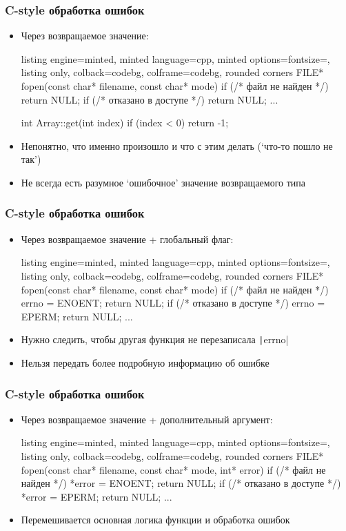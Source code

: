 \documentclass[10pt]{beamer}
\begin{document}
\begin{frame}[fragile]
\frametitle{C-style обработка ошибок}
\begin{itemize}
\item Через возвращаемое значение:
\begin{tcblisting}{listing engine=minted, minted language=cpp, minted options={fontsize=\scriptsize}, listing only, colback=codebg, colframe=codebg, rounded corners}
FILE* fopen(const char* filename, const char* mode) {
  if (/* файл не найден */) {
    return NULL;
  }
  if (/* отказано в доступе */) {
    return NULL;
  }
  ...
}

int Array::get(int index) {
  if (index < 0) return -1;
}
\end{tcblisting}
\pause
\item Непонятно, что именно произошло и что с этим делать (`что-то пошло не так')
\pause
\item Не всегда есть разумное `ошибочное' значение возвращаемого типа
\end{itemize}
\end{frame}

\begin{frame}[fragile]
\frametitle{C-style обработка ошибок}
\begin{itemize}
\item Через возвращаемое значение + глобальный флаг:
\begin{tcblisting}{listing engine=minted, minted language=cpp, minted options={fontsize=\scriptsize}, listing only, colback=codebg, colframe=codebg, rounded corners}
FILE* fopen(const char* filename, const char* mode) {
  if (/* файл не найден */) {
    errno = ENOENT;
    return NULL;
  }
  if (/* отказано в доступе */) {
    errno = EPERM;
    return NULL;
  }
  ...
}
\end{tcblisting}
\pause
{}
\item Нужно следить, чтобы другая функция не перезаписала \texttt|errno|
\pause
\item Нельзя передать более подробную информацию об ошибке
\end{itemize}
\end{frame}

\begin{frame}[fragile]
\frametitle{C-style обработка ошибок}
\begin{itemize}
\item Через возвращаемое значение + дополнительный аргумент:
\begin{tcblisting}{listing engine=minted, minted language=cpp, minted options={fontsize=\scriptsize}, listing only, colback=codebg, colframe=codebg, rounded corners}
FILE* fopen(const char* filename, const char* mode, int* error)
{
  if (/* файл не найден */) {
    *error = ENOENT;
    return NULL;
  }
  if (/* отказано в доступе */) {
    *error = EPERM;
    return NULL;
  }
  ...
}
\end{tcblisting}
\pause
{}
\item Перемешивается основная логика функции и обработка ошибок
\end{itemize}
\end{frame}
\end{document}
